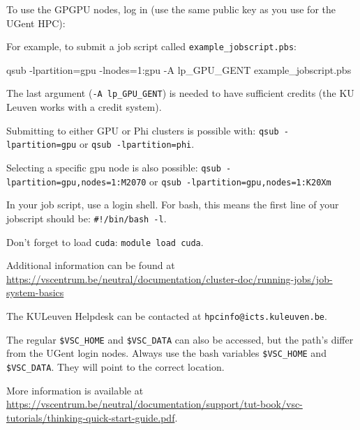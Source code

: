 To use the GPGPU nodes, log in (use the same public key as you use for the UGent HPC):

\begin{prompt}
\end{prompt}

For example, to submit a job script called \lstinline|example_jobscript.pbs|:

\begin{prompt}
qsub -lpartition=gpu -lnodes=1:gpu -A lp_GPU_GENT example_jobscript.pbs
\end{prompt}

The last argument (\lstinline|-A lp_GPU_GENT|) is needed to have sufficient credits
(the KU Leuven works with a credit system).

Submitting to either GPU or Phi clusters is possible with: \lstinline|qsub -lpartition=gpu|
or \lstinline|qsub -lpartition=phi|.

Selecting a specific gpu node is also possible:
\lstinline|qsub -lpartition=gpu,nodes=1:M2070| or \lstinline|qsub -lpartition=gpu,nodes=1:K20Xm|

In your job script, use a login shell. For bash, this means the first line of your jobscript should be:
\lstinline|#!/bin/bash -l|.

Don't forget to load \lstinline|cuda|: \lstinline|module load cuda|.

Additional information can be found at \url{https://vscentrum.be/neutral/documentation/cluster-doc/running-jobs/job-system-basics}

The KULeuven Helpdesk can be contacted at \lstinline|hpcinfo@icts.kuleuven.be|.


The regular \lstinline|$VSC_HOME| and \lstinline|$VSC_DATA| can also be accessed,
but the path's differ from the UGent login nodes. Always use the bash variables \lstinline|$VSC_HOME|
and \lstinline|$VSC_DATA|. They will point to the correct location.

More information is available at \url{https://vscentrum.be/neutral/documentation/support/tut-book/vsc-tutorials/thinking-quick-start-guide.pdf}.
\fi
